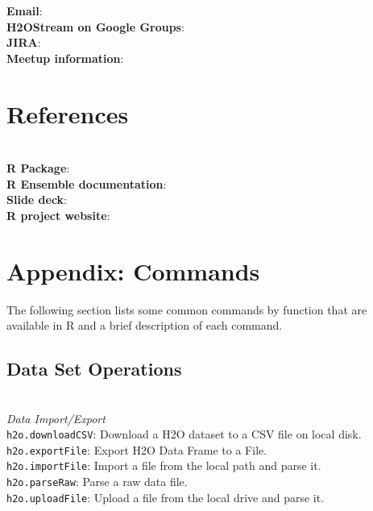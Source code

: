 \documentclass[11pt]{article}
\begin{document}
{\textbf{Email}}: {}\\

{\textbf{H2OStream on Google Groups}}: {}\\

{\textbf{JIRA}}: {}\\

{\textbf{Meetup information}}: {}\\


\section{References}\\


{\bfseries{R Package}}:  \\

{\bfseries{R Ensemble documentation}}:  \\

{\bfseries{Slide deck}}:  \\

{\bfseries{R project website}}:  \\


\section{Appendix: Commands} \label{Appendix} 

The following section lists some common commands by function that are available in R and a brief description of each command. 
\subsection {Data Set Operations}\\

{\emph{Data Import/Export}} \\ 
{\texttt{h2o.downloadCSV}}: Download a H2O dataset to a CSV file on local disk.\\
{\texttt{h2o.exportFile}}: Export H2O Data Frame to a File.\\
{\texttt{h2o.importFile}}: Import a file from the local path and parse it.\\
{\texttt{h2o.parseRaw}}: Parse a raw data file. \\
{\texttt{h2o.uploadFile}}: Upload a file from the local drive and parse it.\\
\end{document}
